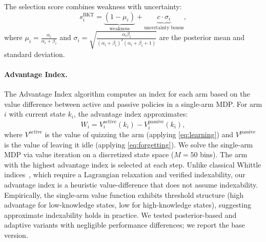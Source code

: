 The selection score combines weakness with uncertainty:
\begin{equation}
    s_i^{\text{BKT}} = \underbrace{(1 - \mu_i)}_{\text{weakness}} + \underbrace{c \cdot \sigma_i}_{\text{uncertainty bonus}},
    \label{eq:bkt}
\end{equation}
where $\mu_i = \frac{\alpha_i}{\alpha_i + \beta_i}$ and $\sigma_i = \sqrt{\frac{\alpha_i \beta_i}{(\alpha_i + \beta_i)^2(\alpha_i + \beta_i + 1)}}$ are the posterior mean and standard deviation.

\paragraph{Advantage Index.}
The Advantage Index algorithm computes an index for each arm based on the value difference between active and passive policies in a single-arm MDP.
For arm $i$ with current state $k_i$, the advantage index approximates:
\begin{equation}
    W_i = V_i^{\text{active}}(k_i) - V_i^{\text{passive}}(k_i),
    \label{eq:whittle}
\end{equation}
where $V^{\text{active}}$ is the value of quizzing the arm (applying \eqref{eq:learning}) and $V^{\text{passive}}$ is the value of leaving it idle (applying \eqref{eq:forgetting}).
We solve the single-arm MDP via value iteration on a discretized state space ($M{=}50$ bins).
The arm with the highest advantage index is selected at each step.
Unlike classical Whittle indices~\citep{whittle1988restless}, which require a Lagrangian relaxation and verified indexability, our advantage index is a heuristic value-difference that does not assume indexability.
Empirically, the single-arm value function exhibits threshold structure (high advantage for low-knowledge states, low for high-knowledge states), suggesting approximate indexability holds in practice.
We tested posterior-based and adaptive variants with negligible performance differences; we report the base version.

